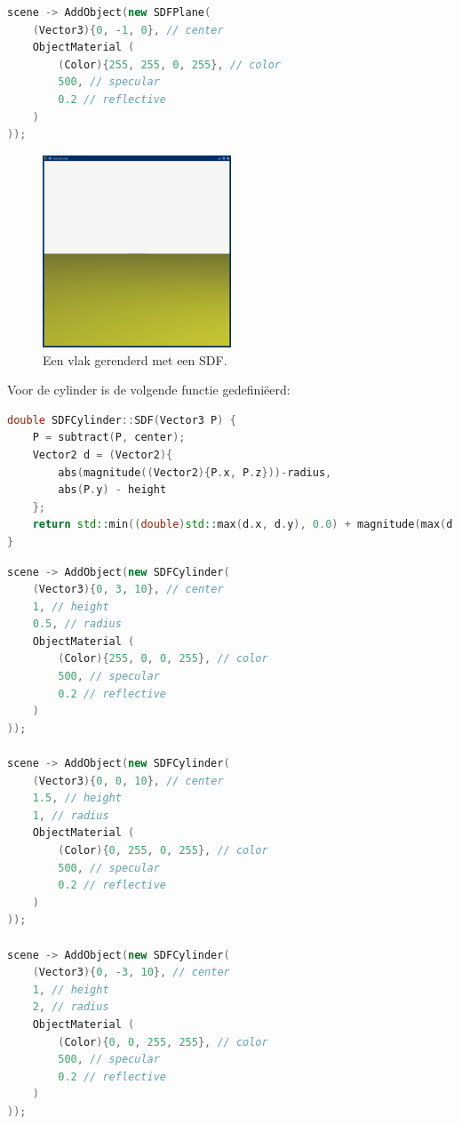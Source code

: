 \documentclass[12pt, a4paper]{article}
\begin{document}
\begin{lstlisting}[language=C++]
scene -> AddObject(new SDFPlane(
    (Vector3){0, -1, 0}, // center
    ObjectMaterial (
        (Color){255, 255, 0, 255}, // color
        500, // specular
        0.2 // reflective
    )
));
\end{lstlisting}

\begin{figure}[h]
    \centering
    \includegraphics[width=0.50\textwidth]{renders/plane.png}
    \caption{Een vlak gerenderd met een SDF.}
    \label{fig:plane}
\end{figure}

Voor de cylinder is de volgende functie gedefiniëerd:
\begin{lstlisting}[language=C++]
double SDFCylinder::SDF(Vector3 P) {
    P = subtract(P, center);
    Vector2 d = (Vector2){
        abs(magnitude((Vector2){P.x, P.z}))-radius,
        abs(P.y) - height
    };
    return std::min((double)std::max(d.x, d.y), 0.0) + magnitude(max(d, 0.0));
}
\end{lstlisting}

\begin{lstlisting}[language=C++]
scene -> AddObject(new SDFCylinder(
    (Vector3){0, 3, 10}, // center
    1, // height
    0.5, // radius
    ObjectMaterial (
        (Color){255, 0, 0, 255}, // color
        500, // specular
        0.2 // reflective
    )
));

scene -> AddObject(new SDFCylinder(
    (Vector3){0, 0, 10}, // center
    1.5, // height
    1, // radius
    ObjectMaterial (
        (Color){0, 255, 0, 255}, // color
        500, // specular
        0.2 // reflective
    )
));

scene -> AddObject(new SDFCylinder(
    (Vector3){0, -3, 10}, // center
    1, // height
    2, // radius
    ObjectMaterial (
        (Color){0, 0, 255, 255}, // color
        500, // specular
        0.2 // reflective
    )
));
\end{lstlisting}
\end{document}

